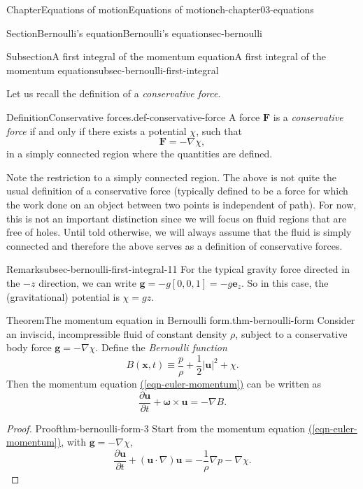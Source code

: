 \documentclass[oneside,10pt,]{book}
\newcommand{\xreffont}{\relax}
\numberwithin{equation}{section}
\newcommand{\pd}[2]{\frac{\partial#1}{\partial#2}}
\newcommand{\bx}{\boldsymbol{x}}
\newcommand{\be}{\boldsymbol{e}}
\newcommand{\bu}{\boldsymbol{u}}
\newcommand{\bg}{\boldsymbol{g}}
\newcommand{\bF}{\boldsymbol{F}}
\newcommand{\bomega}{\boldsymbol{\omega}}
\begin{document}
\begin{chapterptx}{Chapter}{Equations of motion}{}{Equations of motion}{}{}{ch-chapter03-equations}
\begin{sectionptx}{Section}{Bernoulli's equation}{}{Bernoulli's equation}{}{}{sec-bernoulli}
\begin{subsectionptx}{Subsection}{A first integral of the momentum equation}{}{A first integral of the momentum equation}{}{}{subsec-bernoulli-first-integral}
\par
Let us recall the definition of a \emph{conservative force}.%
\begin{definition}{Definition}{Conservative forces.}{}{def-conservative-force}%
A force \(\bF\) is a \emph{conservative force} if and only if there exists a potential \(\chi\), such that%
\begin{equation*}
\bF = -\nabla \chi,
\end{equation*}
in a simply connected region where the quantities are defined.%
\end{definition}
Note the restriction to a simply connected region. The above is not quite the usual definition of a conservative force (typically defined to be a force for which the work done on an object between two points is independent of path). For now, this is not an important distinction since we will focus on fluid regions that are free of holes. Until told otherwise, we will always assume that the fluid is simply connected and therefore the above serves as a definition of conservative forces.%
\begin{remark}{Remark}{}{subsec-bernoulli-first-integral-11}%
For the typical gravity force directed in the \(-z\) direction, we can write \(\bg =
-g[0, 0, 1] = -g \be_z\). So in this case, the (gravitational) potential is \(\chi = gz\).%
\end{remark}
\begin{theorem}{Theorem}{The momentum equation in Bernoulli form.}{}{thm-bernoulli-form}%
Consider an inviscid, incompressible fluid of constant density \(\rho\), subject to a conservative body force \(\bg = -\nabla\chi\). Define the \emph{Bernoulli function}%
\begin{equation}
B(\bx, t) \equiv \frac{p}{\rho} + \frac{1}{2}|\bu|^2 + \chi.\label{eqn-bernoulli-B}
\end{equation}
Then the momentum equation \hyperref[eqn-euler-momentum]{({\xreffont\ref{eqn-euler-momentum}})} can be written as%
\begin{equation}
\pd{\bu}{t} + \bomega \times \bu = -\nabla B.\label{eqn-bernoulli-vorticity}
\end{equation}
%
\end{theorem}
\begin{proof}{Proof}{}{thm-bernoulli-form-3}
Start from the momentum equation \hyperref[eqn-euler-momentum]{({\xreffont\ref{eqn-euler-momentum}})}, with \(\bg =
-\nabla \chi\),%
\begin{equation*}
\pd{\bu}{t} + (\bu \cdot \nabla)\bu = - \frac{1}{\rho}\nabla p - \nabla \chi.

\end{equation*}
\end{proof}
\end{subsectionptx}
\end{sectionptx}
\end{chapterptx}
\end{document}
